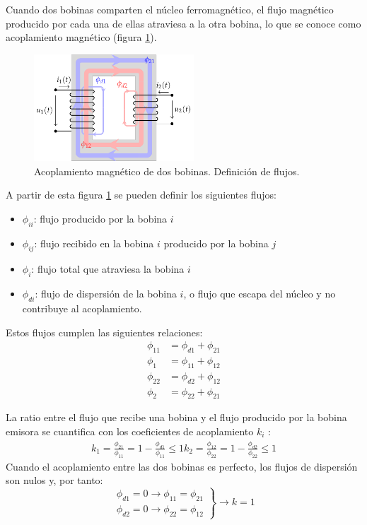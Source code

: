 Cuando dos bobinas comparten el núcleo ferromagnético, el flujo magnético producido por cada una de ellas atraviesa a la otra bobina, lo que se conoce como acoplamiento magnético (figura \ref{fig:acoplamiento}).

\begin{figure}[H]
  \centering
  \includegraphics[height=4cm]{../figs/acoplamientoTikz.pdf}
    \caption{Acoplamiento magnético de dos bobinas. Definición de flujos.}
  \label{fig:acoplamiento}
\end{figure}

A partir de esta figura \ref{fig:acoplamiento} se pueden definir los siguientes flujos:
\begin{itemize}
\item   $\phi_{ii}$: flujo producido por la bobina $i$
\item   $\phi_{ij}$: flujo recibido en la bobina $i$ producido por la bobina $j$
\item   $\phi_{i}$: flujo total que atraviesa la bobina $i$
\item   $\phi_{di}$: flujo de dispersión de la bobina $i$, o flujo que escapa del núcleo y no contribuye al acoplamiento.
\end{itemize}

Estos flujos cumplen las siguientes relaciones:
\begin{align*}
  \phi_{11} &= \phi_{d1} + \phi_{21}\\
  \phi_{1} &= \phi_{11} + \phi_{12}\\
  \phi_{22} &= \phi_{d2} + \phi_{12}\\
  \phi_{2} &= \phi_{22} + \phi_{21}
\end{align*}

La ratio entre el flujo que recibe una bobina y el flujo producido por la bobina emisora se cuantifica con los coeficientes de acoplamiento $k_i$ :
\begin{align}
  \label{eq:coefs-acoplamiento}
  k_1 = \frac{\phi_{21}}{\phi_{11}} = 1 - \frac{\phi_{d1}}{\phi_{11}} \leq 1
  k_2 = \frac{\phi_{12}}{\phi_{22}} = 1 - \frac{\phi_{d2}}{\phi_{22}} \leq 1
\end{align}
Cuando el acoplamiento entre las dos bobinas es perfecto, los flujos de dispersión son nulos y, por tanto:
\[\left.
\begin{array}{cc}
  \phi_{d1} = 0 \rightarrow   \phi_{11} = \phi_{21}\\
  \phi_{d2} = 0 \rightarrow \phi_{22} = \phi_{12} 
  \end{array} \right\} \rightarrow k = 1
\]

